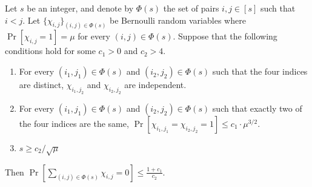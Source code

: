 



\iffalse
\begin{claim}\label{clm:cheb1}
Let $s$ be an integer, and denote by $\Phi(s)$ the set of pairs $i,j\in [s]$ such that $i<j$.
Let $\{\chi_{i,j}\}_{(i,j)\in \Phi(s)}$ be Bernoulli random variables where
 $\Pr[\chi_{i,j} = 1] = \mu$ for every $(i,j)\in \Phi(s)$. Suppose that the following conditions hold
 for some $c_1>0$ and $c_2 > 4$.
\begin{enumerate}
\item For every $(i_1,j_1)\in \Phi(s)$ and $(i_2,j_2)\in \Phi(s)$ such that the four indices are distinct, $\chi_{i_1,j_2}$ and $\chi_{i_2,j_2}$ are independent.
\item For every $(i_1,j_1)\in \Phi(s)$ and $(i_2,j_2)\in \Phi(s)$  such that exactly two of the four indices are the same,
$\Pr[\chi_{i_1,j_1}=\chi_{i_2,j_2} = 1] \leq c_1\cdot \mu^{3/2}$.
\item %
   $s \geq c_2/\sqrt{\mu}$
\end{enumerate}
Then $\Pr\left[ \sum_{(i,j)\in \Phi(s)} \chi_{i,j} = 0\right] \leq \frac{1+c_1}{c_2}$.
\end{claim}

